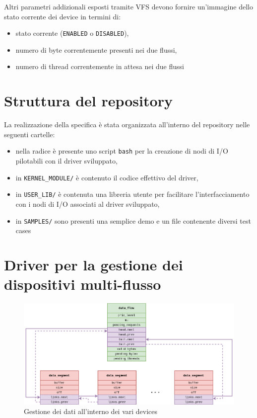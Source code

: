 \documentclass{article}
\begin{document}
Altri parametri addizionali esposti tramite VFS devono fornire un'immagine dello stato corrente dei device in termini di:
\begin{itemize}
        \item stato corrente (\texttt{ENABLED} o \texttt{DISABLED}),
        \item numero di byte correntemente presenti nei due flussi,
        \item numero di thread correntemente in attesa nei due flussi
\end{itemize}

\section{Struttura del repository}
La realizzazione della specifica è stata organizzata all'interno del repository nelle seguenti cartelle:
\begin{itemize}
        \item nella radice è presente uno script \texttt{bash} per la creazione di nodi di I/O pilotabili con il driver sviluppato,
        \item in \texttt{KERNEL\_MODULE/} è contenuto il codice effettivo del driver,
        \item in \texttt{USER\_LIB/} è contenuta una libreria utente per facilitare l'interfacciamento con i nodi di I/O associati al driver sviluppato,
        \item in \texttt{SAMPLES/} sono presenti una semplice demo e un file contenente diversi test cases
\end{itemize}

\section{Driver per la gestione dei dispositivi multi-flusso}
\begin{figure}[htbp]
        \centering
        \includegraphics[width=.8\textwidth]{data}
        \caption{Gestione dei dati all'interno dei vari devices}
        \label{fig:data}
\end{figure}
\end{document}
